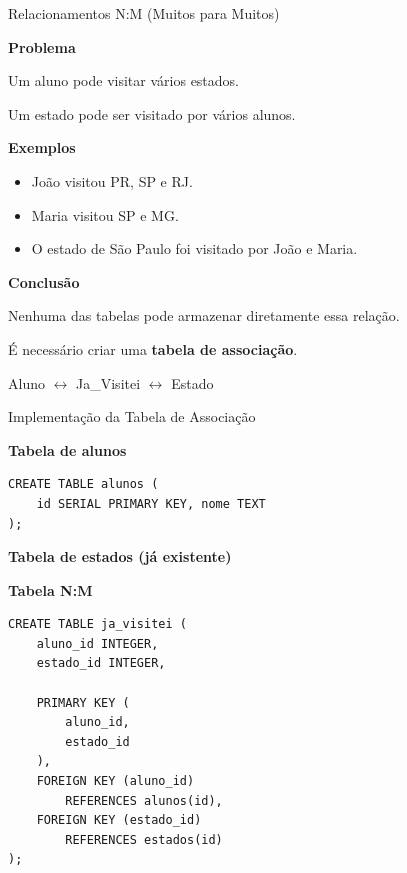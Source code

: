 \documentclass{beamer}
\begin{document}
\begin{frame}{Relacionamentos N:M (Muitos para Muitos)}

\textbf{Problema}

Um aluno pode visitar vários estados.

\vspace{0.2cm}

Um estado pode ser visitado por vários alunos.

\vspace{0.4cm}

\textbf{Exemplos}

\begin{itemize}
    \item João visitou PR, SP e RJ.
    \item Maria visitou SP e MG.
    \item O estado de São Paulo foi visitado por João e Maria.
\end{itemize}

\vspace{0.4cm}

\textbf{Conclusão}

Nenhuma das tabelas pode armazenar diretamente essa relação.

É necessário criar uma \textbf{tabela de associação}.

\vspace{0.3cm}

\begin{center}
Aluno
$\leftrightarrow$
Ja\_Visitei
$\leftrightarrow$
Estado
\end{center}

\end{frame}


\begin{frame}[fragile]{Implementação da Tabela de Associação}

\textbf{Tabela de alunos}

\begin{verbatim}
CREATE TABLE alunos (
    id SERIAL PRIMARY KEY, nome TEXT
);
\end{verbatim}

\textbf{Tabela de estados (já existente)}

\textbf{Tabela N:M}

\begin{verbatim}
CREATE TABLE ja_visitei (
    aluno_id INTEGER,
    estado_id INTEGER,

    PRIMARY KEY (
        aluno_id,
        estado_id
    ),
    FOREIGN KEY (aluno_id)
        REFERENCES alunos(id),
    FOREIGN KEY (estado_id)
        REFERENCES estados(id)
);
\end{verbatim}

\end{frame}
\end{document}
